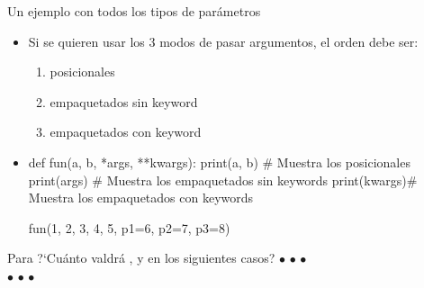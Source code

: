 \documentclass[10pt,envcountsect,spanish]{beamer}
\begin{document}
\begin{frame}[fragile]{Un ejemplo con todos los tipos de parámetros}

\begin{itemize}\setlength{\itemsep}{2mm}

\item Si se quieren usar los 3 modos de pasar argumentos, el orden debe ser:
\begin{enumerate}
\item posicionales 
\item empaquetados sin keyword
\item empaquetados con keyword
\end{enumerate} 

\item[] \unEjemplo

\begin{pyconsole}[][frame=single, fontsize=\footnotesize]
def fun(a, b, *args, **kwargs): 
    print(a, b)  # Muestra los posicionales
    print(args)  # Muestra los empaquetados sin keywords
    print(kwargs)# Muestra los empaquetados con keywords

fun(1, 2, 3, 4, 5, p1=6, p2=7, p3=8)
\end{pyconsole}
\end{itemize}

\small 
\begin{ejercicio}{}
Para  
?`Cuánto valdrá ,  y  en los siguientes casos?
\footnotesize
$\bullet$ 
$\bullet$  
$\bullet$   \\
$\bullet$  
$\bullet$  
$\bullet$  
\end{ejercicio}

\end{frame}
\end{document}
